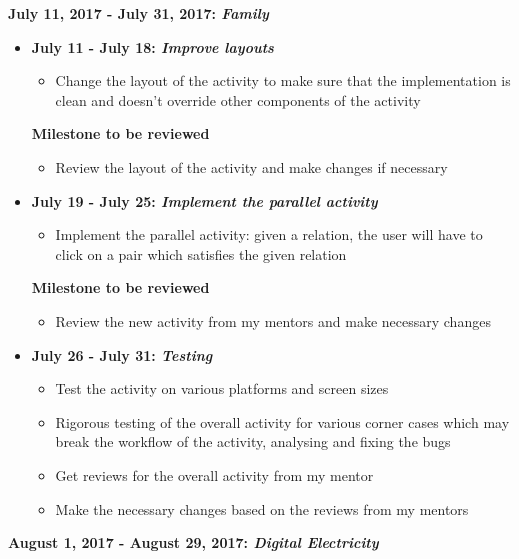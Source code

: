 \documentclass[preprint,12pt]{elsarticle}
\begin{document}
\textbf{July 11, 2017 - July 31, 2017: \textit{Family}}
\begin{itemize}

\item \textbf{July 11 - July 18: \textit{Improve layouts}}
\begin{itemize}
\item Change the layout of the activity to make sure that the implementation is clean and doesn't override other components of the activity
\end{itemize}

\textbf{Milestone to be reviewed}
\begin{itemize}
\item Review the layout of the activity and make changes if necessary
\end{itemize}

\item \textbf{July 19 - July 25: \textit{Implement the parallel activity}}
\begin{itemize}
\item Implement the parallel activity: given a relation, the user will have to click on a pair which satisfies the given relation
\end{itemize}

\textbf{Milestone to be reviewed}
\begin{itemize}
\item Review the new activity from my mentors and make necessary changes
\end{itemize}

\item \textbf{July 26 - July 31: \textit{Testing}}
\begin{itemize}
\item Test the activity on various platforms and screen sizes
\item Rigorous testing of the overall activity for various corner cases which may break the workflow of the activity, analysing and fixing the bugs
\item Get reviews for the overall activity from my mentor
\item Make the necessary changes based on the reviews from my mentors
\end{itemize}

\end{itemize}

\textbf{August 1, 2017 - August 29, 2017: \textit{Digital Electricity}}
\end{document}
